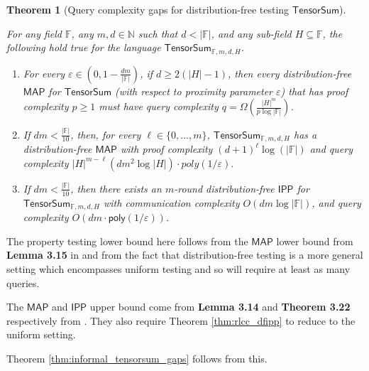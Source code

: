 \documentclass[10pt,a4paper]{article}
\newtheorem{theorem}{Theorem}[section]
\newcommand{\poly}{\mathsf{poly}}
\newcommand{\IPP}{\mathsf{IPP}}
\newcommand{\MAP}{\mathsf{MAP}}
\newcommand{\TensorSum}{\mathsf{TensorSum}}
\newcommand{\F}{\mathbb{F}}
\newcommand{\N}{\mathbb{N}}
\begin{document}
\begin{theorem}[Query complexity gaps for distribution-free testing $\TensorSum$]
\label{thm:formal_tensorsum_gaps}

For any field $\F$, any $m,d \in \N$ such that $d < \vert \F \vert$, and any sub-field $H \subseteq \F$, the following hold true for the language $\TensorSum_{\F,m,d,H}$.
\begin{enumerate}
    \item For every $\varepsilon \in \left( 0, 1 - \frac{dm}{|\mathbb{F}|} \right)$, if $d \geq 2(|H| - 1)$, then every distribution-free $\MAP$ for $\TensorSum$ (with respect to proximity parameter $\varepsilon$) that has proof complexity $p \geq 1$ must have query complexity $q = \Omega \left( \frac{|H|^{m}}{p\log |\mathbb{F}|} \right)$. 
    \item If $dm < \frac{|\mathbb{F}|}{10}$, then, for every $\ell \in \{0, . . . , m\}$, $\TensorSum_{\mathbb{F},m,d,H}$ has a distribution-free $\MAP$ with proof complexity $(d+1)^{\ell} \log(|\mathbb{F}|)$ and query complexity $|H|^{m-\ell}(dm^{2} \log |H|)\cdot poly(1/\varepsilon).$ 
    \item If $dm < \frac{|\mathbb{F}|}{10}$, then there exists an $m$-round distribution-free $\IPP$ for $\TensorSum_{\mathbb{F},m,d,H}$ with communication complexity $O(dm \log |\mathbb{F}|)$, and query complexity $O(dm \cdot \poly(1/\varepsilon))$.
\end{enumerate}
\end{theorem}

The property testing lower bound here follows from the $\MAP$ lower bound from \textbf{Lemma 3.15} in \cite{GR18} and from the fact that distribution-free testing is a more general setting which encompasses uniform testing and so will require at least as many queries.

The $\MAP$ and $\IPP$ upper bound come from \textbf{Lemma 3.14} and \textbf{Theorem 3.22} respectively from \cite{GR18}.  They also require Theorem \ref{thm:rlcc_dfipp} to reduce to the uniform setting.

\noindent Theorem \ref{thm:informal_tensorsum_gaps} follows from this. 
\end{document}
